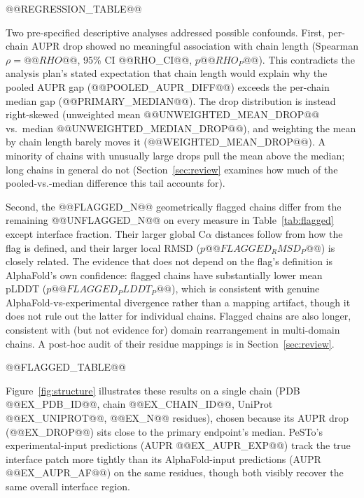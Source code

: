 \documentclass[10pt]{article}
\begin{document}
\begin{table}[t]
\centering
\small
@@REGRESSION_TABLE@@
\caption{Regression of $|p_{\mathrm{AF}}-p_{\mathrm{exp}}|$ on standardized
predictors, cluster-robust standard errors by chain.
Reference category: secondary structure = coil.}
\label{tab:regression}
\end{table}



Two pre-specified descriptive analyses addressed possible confounds. First,
per-chain AUPR drop showed no meaningful association with chain length
(Spearman $\rho = @@RHO@@$, 95\% CI @@RHO_CI@@, $p @@RHO_P@@$). This
contradicts the analysis plan's stated expectation that chain length would
explain why the pooled AUPR gap (@@POOLED_AUPR_DIFF@@) exceeds the per-chain
median gap (@@PRIMARY_MEDIAN@@). The drop distribution is instead
right-skewed (unweighted mean @@UNWEIGHTED_MEAN_DROP@@ vs.\ median
@@UNWEIGHTED_MEDIAN_DROP@@), and weighting the mean by chain length barely
moves it (@@WEIGHTED_MEAN_DROP@@). A minority of chains with unusually large
drops pull the mean above the median; long chains in general do not
(Section~\ref{sec:review} examines how much of the pooled-vs.-median
difference this tail accounts for).

Second, the @@FLAGGED_N@@ geometrically flagged chains differ from
the remaining @@UNFLAGGED_N@@ on every measure in Table~\ref{tab:flagged}
except interface fraction. Their larger global C$\alpha$ distances follow
from how the flag is defined, and their larger local RMSD ($p @@FLAGGED_RMSD_P@@$) is closely related.
The evidence that does not depend on the flag's definition is AlphaFold's own
confidence: flagged chains have substantially lower mean pLDDT
($p @@FLAGGED_PLDDT_P@@$), which is consistent with genuine
AlphaFold-vs-experimental divergence rather than a mapping artifact, though
it does not rule out the latter for individual chains. Flagged chains are
also longer, consistent with (but not evidence for) domain rearrangement in
multi-domain chains. A post-hoc audit of their residue mappings is in
Section~\ref{sec:review}.

\begin{table}[t]
\centering
\small
@@FLAGGED_TABLE@@
\caption{Geometrically flagged vs.\ unflagged primary-set chains
(two-sided Mann--Whitney $U$ test).}
\label{tab:flagged}
\end{table}

Figure~\ref{fig:structure} illustrates these results on a single chain
(PDB @@EX_PDB_ID@@, chain @@EX_CHAIN_ID@@, UniProt @@EX_UNIPROT@@,
@@EX_N@@ residues), chosen because its AUPR drop (@@EX_DROP@@) sits close to
the primary endpoint's median. PeSTo's experimental-input predictions
(AUPR @@EX_AUPR_EXP@@) track the true interface patch more tightly than its
AlphaFold-input predictions (AUPR @@EX_AUPR_AF@@) on the same residues, though
both visibly recover the same overall interface region.
\end{document}
